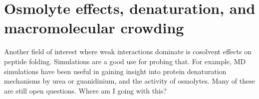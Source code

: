 \section{Osmolyte effects, denaturation, and macromolecular crowding}
Another field of interest where weak interactions dominate is cosolvent effects on peptide folding. Simulations are a good use for probing that.  For example, MD simulations have been useful in gaining insight into protein denaturation mechanisms by urea or guanidinium, and the activity of osmolytes. Many of these are still open questions.\cite{http://pubs.acs.org/doi/abs/10.1021/jp200625k -- crowding and protein association.} Where am I going with this?






